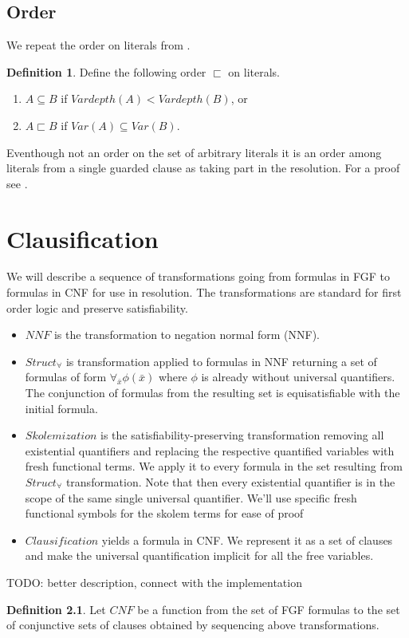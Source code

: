 \documentclass[english, shortabstract]{iithesis}
\theoremstyle{definition} \newtheorem{definition}{Definition}[chapter]
\theoremstyle{remark} \newtheorem{remark}[definition]{Observation}
\theoremstyle{plain} \newtheorem{theorem}[definition]{Theorem}
\theoremstyle{plain} \newtheorem{lemma}[definition]{Lemma}
\begin{document}
\section{Order}
We repeat the order on literals from \cite{resolution gf}.
\begin{definition}
Define the following order $\sqsubset$ on literals.
\begin{enumerate}
    \item $A \subseteq B$ if $Vardepth(A) < Vardepth(B)$, or
    \item $A \sqsubset B$ if $Var(A) \subseteq Var(B)$.
\end{enumerate}
\end{definition}
Eventhough not an order on the set of arbitrary literals it is an order among literals from a single guarded clause as taking part in the resolution.
For a proof see \cite{resolution gf}.

\chapter{Clausification}

We will describe a sequence of transformations going from formulas in FGF to formulas in CNF for use in resolution. 
The transformations are standard for first order logic and preserve satisfiability.
\begin{itemize}
    \item $NNF$ is the transformation to negation normal form (NNF).
    \item $Struct_{\forall}$ is transformation applied to formulas in NNF returning a set of formulas of form $\forall_{\bar{x}}\phi(\bar{x})$ where $\phi$ is already without universal quantifiers. The conjunction of formulas from the resulting set is equisatisfiable with the initial formula.
    \item $Skolemization$ is the satisfiability-preserving transformation removing all existential quantifiers and replacing the respective quantified variables with fresh functional terms.
    We apply it to every formula in the set resulting from $Struct_\forall$ transformation.
    Note that then every existential quantifier is in the scope of the same single universal quantifier.
    We'll use specific fresh functional symbols for the skolem terms for ease of proof
    \item $Clausification$ yields a formula in CNF. We represent it as a set of clauses and make the universal quantification implicit for all the free variables. 
\end{itemize}
TODO: better description, connect with the implementation
\begin{definition}
    Let $CNF$ be a function from the set of FGF formulas to the set of conjunctive sets of clauses obtained by sequencing above transformations.
\end{definition}
\end{document}
